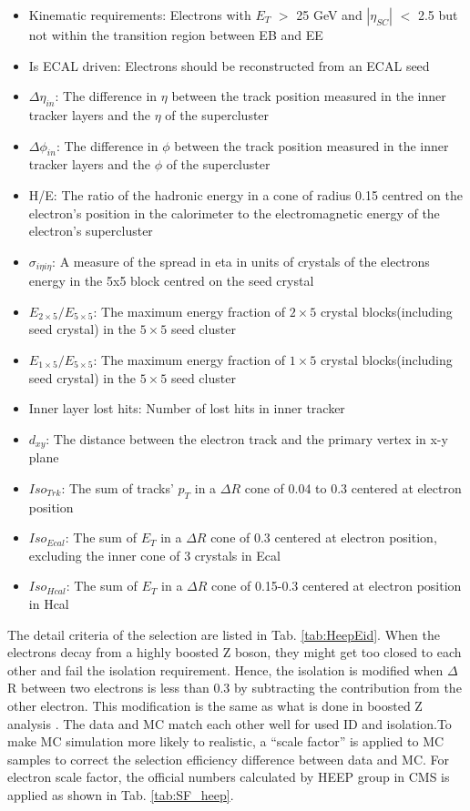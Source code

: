 \begin{itemize}
\item Kinematic requirements: Electrons with $E_{T}$ $>$ 25 GeV and $|\eta_{SC}|$ $<$ 2.5 but not within the transition region between EB and EE
\item Is ECAL driven: Electrons should be reconstructed from an ECAL seed
\item $\Delta\eta_{in}$: The difference in $\eta$ between the track position measured in the inner tracker layers and the $\eta$ of the supercluster
\item $\Delta\phi_{in}$: The difference in $\phi$ between the track position measured in the inner tracker layers and the $\phi$ of the supercluster
\item H/E: The ratio of the hadronic energy in a cone of radius 0.15 centred on the electron's position in the calorimeter to the electromagnetic energy of the electron's supercluster
\item $\sigma_{i\eta i\eta}$: A measure of the spread in eta in units of crystals of the electrons energy in the 5x5 block centred on the seed crystal
\item $E_{2\times5}/E_{5\times5}$: The maximum energy fraction of $2\times5$ crystal blocks(including seed crystal) in the $5\times5$ seed cluster 
\item $E_{1\times5}/E_{5\times5}$: The maximum energy fraction of $1\times5$ crystal blocks(including seed crystal) in the $5\times5$ seed cluster 
\item Inner layer lost hits: Number of lost hits in inner tracker
\item $d_{xy}$: The distance between the electron track and the primary vertex in x-y plane
\item $Iso_{Trk}$: The sum of tracks' $p_{T}$ in a $\Delta R$ cone of 0.04 to 0.3 centered at electron position  
\item $Iso_{Ecal}$: The sum of $E_{T}$ in a $\Delta R$ cone of 0.3 centered at electron position, excluding the inner cone of 3 crystals in Ecal
\item $Iso_{Hcal}$: The sum of $E_{T}$ in a $\Delta R$ cone of 0.15-0.3 centered at electron position in Hcal 
\end{itemize}
The detail criteria of the selection are listed in Tab. \ref{tab:HeepEid}. When the electrons decay from a highly boosted Z boson, they might get too closed to each other and fail the isolation requirement. Hence, the isolation is modified when $\Delta$R between two electrons is less than 0.3 by subtracting the contribution from the other electron. This modification is the same as what is done in boosted Z analysis \cite{ModEleIso}. The data and MC match each other well for used ID and isolation.To make MC simulation more likely to realistic, a ``scale factor'' is applied to MC samples to correct the selection efficiency difference between data and MC. For electron scale factor, the official numbers calculated by HEEP group in CMS is applied\cite{heepSFsyst} as shown in Tab. \ref{tab:SF_heep}.    

